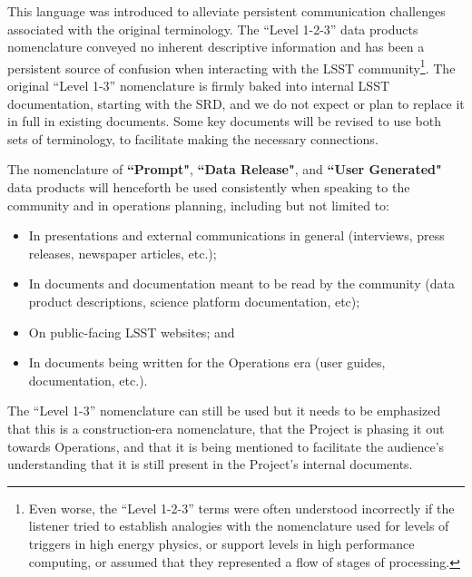 \documentclass[12pt]{article}
\begin{document}
This language was introduced to alleviate persistent communication challenges associated with the original terminology.
The ``Level 1-2-3'' data products nomenclature conveyed no inherent descriptive information and has been a persistent source of confusion when interacting with the LSST community\footnote{Even worse, the ``Level 1-2-3'' terms were often understood incorrectly if the listener tried to establish analogies with the nomenclature used for levels of triggers in high energy physics, or support levels in high performance computing, or assumed that they represented a flow of stages of processing.}.
The original ``Level 1-3'' nomenclature is firmly baked into internal LSST documentation, starting with the SRD, and we do not expect or plan to replace it in full in existing documents.
Some key documents will be revised to use both sets of terminology, to facilitate making the necessary connections.

The nomenclature of {\bf ``Prompt"}, {\bf ``Data Release"}, and {\bf ``User Generated"} data products will henceforth be used consistently when speaking to the community and in operations planning, including but not limited to:
\begin{itemize}
\item In presentations and external communications in general (interviews, press
          releases, newspaper articles, etc.);
\item In documents and documentation meant to be read by the community (data
          product descriptions, science platform documentation, etc);
\item On public-facing LSST websites; and
\item In documents being written for the Operations era (user guides, documentation, etc.).
\end{itemize}

The ``Level 1-3'' nomenclature can still be used but it needs to be emphasized that this is a construction-era nomenclature, that the Project is phasing it out towards Operations, and that it is being mentioned to facilitate the audience's understanding that it is still present in the Project's internal documents.
\end{document}
